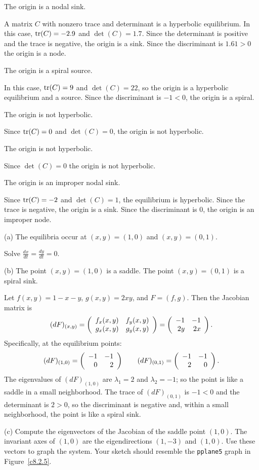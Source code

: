 \documentclass{ximera}
\begin{document}
 \ans The origin is a nodal sink.

\soln A matrix $C$ with nonzero trace and determinant is a hyperbolic
equilibrium.  In this case, ${\rm tr}(C) = -2.9$ and $\det(C) = 1.7$.
Since the determinant is positive and the trace is negative, the origin
is a sink. Since the discriminant is $1.61>0$ the origin is a node.

 \ans The origin is a spiral source.

\soln In this case, ${\rm tr}(C) = 9$ and $\det(C) = 22$, so the origin
is a hyperbolic equilibrium and a source.  Since the discriminant is 
$-1<0$, the origin is a spiral.

 \ans The origin is not hyperbolic.

\soln Since ${\rm tr}(C) = 0$ and $\det(C) = 0$, the origin is not 
hyperbolic. 

 \ans The origin is not hyperbolic.

\soln Since $\det(C) = 0$ the origin is not hyperbolic.

 \ans The origin is an improper nodal sink.

\soln Since ${\rm tr}(C) = -2$ and $\det(C) = 1$, the equilibrium
is hyperbolic. Since the trace is negative, the origin is a sink.
Since the discriminant is $0$, the origin is an improper node. 

(a) \ans The equilibria occur at $(x,y) = (1,0)$ and $(x,y) = (0,1)$.

\soln Solve $\frac{dx}{dt} = \frac{dy}{dt} = 0$.

(b) \ans The point $(x,y) = (1,0)$ is a saddle.  The point $(x,y) = (0,1)$
is a spiral sink.

\soln Let $f(x,y) = 1 - x - y$, $g(x,y) = 2xy$,
and $F = (f,g)$.  Then the Jacobian matrix is
\[
(dF)_{(x,y)} = \left(\begin{array}{rr} f_x(x,y) & f_y(x,y)\\ g_x(x,y) &g_y(x,y)\end{array}\right)
= \left(\begin{array}{rr} -1 & -1\\ 2y &2x\end{array}\right).
\]
Specifically, at the equilibrium points:
\[
(dF)_{(1,0)} = \left(\begin{array}{rr} -1 & -1\\ 0 &2\end{array}\right) \qquad
(dF)_{(0,1)} = \left(\begin{array}{rr} -1 & -1\\ 2 &0\end{array}\right).
\]
The eigenvalues of $(dF)_{(1,0)}$ are $\lambda_1 = 2$ and $\lambda_2 = -1$;
so the point is like a saddle in a small neighborhood.  The trace of
$(dF)_{(0,1)}$ is $-1 < 0$ and the determinant is $2 > 0$, so the
discriminant is negative and, within a small neighborhood, the point
is like a spiral sink.

(c) Compute the eigenvectors of the Jacobian of the saddle point $(1,0)$.
The invariant axes of $(1,0)$ are the eigendirections $(1,-3)$ and
$(1,0)$.  Use these vectors to graph the system.  Your sketch should
resemble the {\tt pplane5} graph in Figure~\ref{c8.2.5}.
\end{document}
